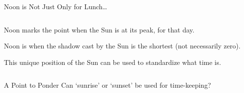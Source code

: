 \begin{myFrame}{Noon is Not Just Only for Lunch\ldots}{}

\begin{columns}
\bigskip
{}
%
\setCol
\small
\begin{itemize}
\col Noon marks the point when the Sun is at its peak, for that day.

\col Noon is when the shadow cast by the Sun is the shortest (not necessarily zero).

\col This unique position of the Sun can be used to standardize what time is.


\end{itemize}
\end{columns}
\begin{myBlock}[0.6\linewidth]{\centering A Point to Ponder}
\centering Can `sunrise' or `sunset' be used for time-keeping?
\end{myBlock}
\end{myFrame}

